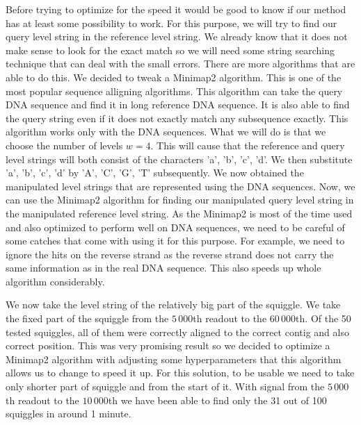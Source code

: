 Before trying to optimize for the speed it would be good to know if our method
has at least some possibility to work. For this purpose, we will try to
find our query level string in the reference level string. We already know that
it does not make sense to look for the exact match so we will need some string searching
technique that can deal with the small errors. There are more algorithms that are able
to do this. We decided to tweak a Minimap2 \cite{li2018minimap2} algorithm. This is
one of the most popular sequence alligning algorithms. This algorithm can take the
query DNA sequence and find it in long reference DNA sequence. It is also able to
find the query string even if it does not exactly match any subsequence exactly.
This algorithm works only with the DNA sequences. What we will do is that we choose
the number of levels $w=4$. This will cause that the reference and query level strings will both consist of
the characters 'a', 'b', 'c', 'd'. We then substitute 'a', 'b', 'c', 'd' by
'A', 'C', 'G', 'T' subsequently. We now obtained the manipulated level strings that
are represented using the DNA sequences. Now, we can use the Minimap2 algorithm for
finding our manipulated query level string in the manipulated reference level string.
As the Minimap2 is most of the time used and also optimized to perform well on DNA
sequences, we need to be careful of some catches that come with using it for this
purpose. For example, we need to ignore the hits on the reverse strand as the
reverse strand does not carry the same information as in the real DNA sequence.
This also speeds up whole algorithm considerably.

We now take the level string of the relatively big part of the squiggle. We take the
fixed part of the squiggle from the $5\,000$th readout to the $60\,000$th. Of the 50
tested squiggles, all of them were correctly aligned to the correct contig and also
correct position. This was very promising result so we decided to optimize a
Minimap2 algorithm with adjusting some hyperparameters that this algorithm allows us
to change to speed it up. For this solution, to be usable we need to take only
shorter part of squiggle and from the start of it. With signal from the $5\,000$th
readout to the $10\,000$th we have been able to find only the 31 out of 100 squiggles
in around 1 minute. 
